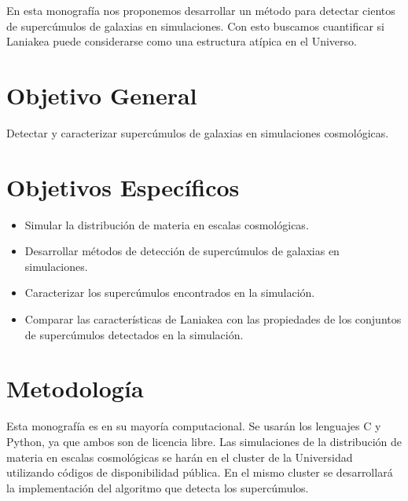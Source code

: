 \documentclass[12pt]{article}
\begin{document}
En esta monograf\'{i}a nos proponemos desarrollar un m\'etodo para
detectar cientos de superc\'{u}mulos de galaxias en simulaciones. 
Con esto buscamos cuantificar si Laniakea puede considerarse como una
estructura at\'ipica en el Universo.
\\

\section{Objetivo General}

Detectar y caracterizar superc\'{u}mulos de galaxias en simulaciones
cosmol\'{o}gicas. 
\\

\section{Objetivos Espec\'{i}ficos}

\begin{itemize}
	\item Simular la distribuci\'on de materia en escalas
          cosmol\'{o}gicas. 
	\item Desarrollar m\'{e}todos de detecci\'on de
          superc\'{u}mulos de galaxias en simulaciones.
	\item Caracterizar los superc\'umulos encontrados en la
          simulaci\'on.
        \item Comparar las caracter\'isticas de Laniakea con las
          propiedades de los conjuntos de superc\'umulos detectados en
          la simulaci\'on.
\end{itemize}

\section{Metodolog\'{i}a}

Esta monograf\'{i}a es en su mayor\'{i}a computacional. 
Se usar\'{a}n los lenguajes C y Python, ya que ambos son de licencia
libre. 
Las simulaciones de la distribuci\'on de materia en escalas
cosmol\'ogicas se har\'an en el cluster de la Universidad utilizando
c\'odigos de disponibilidad p\'ublica.
En el mismo cluster se desarrollar\'a la implementaci\'on del
algoritmo que detecta los superc\'umulos.
\\
\end{document}
